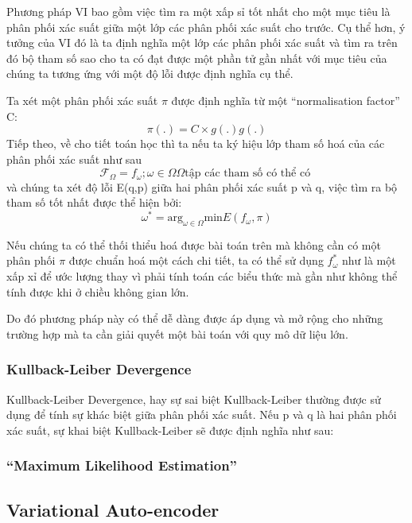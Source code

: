         Phương pháp VI bao gồm việc tìm ra một xấp sỉ tốt nhất cho một mục tiêu là phân phối xác suất giữa một lớp các phân phối xác suất cho trước. Cụ thể hơn, ý tưởng của VI đó là ta định nghĩa một lớp các phân phối xác suất và tìm ra trên đó bộ tham số sao cho ta có đạt được một phần tử gần nhất với mục tiêu của chúng ta tương ứng với một độ lỗi được định nghĩa cụ thể. 

        Ta xét một phân phối xác suất $\pi$ được định nghĩa từ một ``normalisation factor'' C:        
        $$\pi(.) = C \times g(.) g(.)$$
        Tiếp theo, về cho tiết toán học thì ta nếu ta ký hiệu lớp tham số hoá của các phân phối xác suất như sau
        $$\mathcal{F}_\Omega = {f_\omega; \omega \in \Omega} \Omega  \text{tập các tham số có thể có  }$$
        và chúng ta xét độ lỗi E(q,p) giữa hai phân phối xác suất p và q, việc tìm ra bộ tham số tốt nhất được thể hiện bởi:
        $$\omega^* = \text{arg}_{\omega\in\Omega} \text{min}E(f_\omega,\pi) $$

        Nếu chúng ta có thể thối thiểu hoá được bài toán trên mà không cần có một phân phối $\pi$ được chuẩn hoá một cách chi tiết, ta có thể  sử dụng $f_\omega^*$ như là một xấp xỉ để ước lượng thay vì phải tính toán các biểu thức mà gần như không thể tính được khi ở chiều không gian lớn. 
        
        Do đó phương pháp này có thể dễ dàng được áp dụng và mở rộng cho những trường hợp mà ta cần giải quyết một bài toán với quy mô dữ liệu lớn. 
        
        \subsubsection{Kullback-Leiber Devergence}
        Kullback-Leiber Devergence, hay sự sai biệt Kullback-Leiber thường được sử dụng để tính sự khác biệt giữa phân phối xác suất. 
        Nếu p và q là hai phân phối xác suất, sự khai biệt Kullback-Leiber sẽ được định nghĩa như sau:

        \subsubsection{ ``Maximum Likelihood Estimation''}
        



        \subsection{Variational Auto-encoder} 
